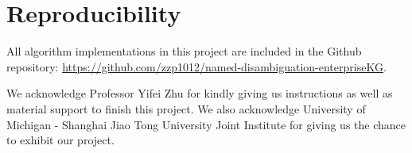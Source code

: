 \documentclass[sigconf, nonacm]{acmart}
\begin{document}
\section{Reproducibility}
All algorithm implementations in this project are included in the Github repository: \url{https://github.com/zzp1012/named-disambiguation-enterpriseKG}.\footnotemark[1]
\begin{acks}
We acknowledge Professor Yifei Zhu for kindly giving us instructions as well as material support to finish this project. We also acknowledge University of Michigan - Shanghai Jiao Tong University Joint Institute for giving us the chance to exhibit our project.
\end{acks}



\end{document}
